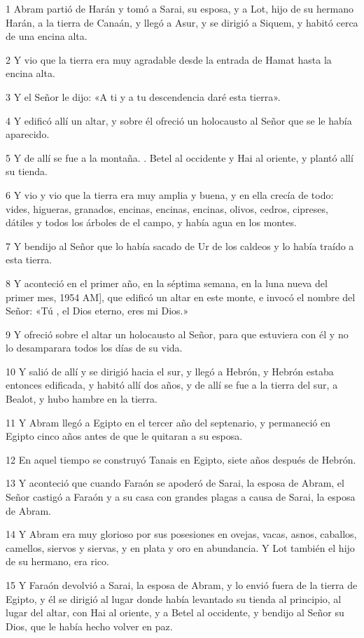 \par 1 Abram partió de Harán y tomó a Sarai, su esposa, y a Lot, hijo de su hermano Harán, a la tierra de Canaán, y llegó a Asur, y se dirigió a Siquem, y habitó cerca de una encina alta.
\par 2 Y vio que la tierra era muy agradable desde la entrada de Hamat hasta la encina alta.
\par 3 Y el Señor le dijo: «A ti y a tu descendencia daré esta tierra».
\par 4 Y edificó allí un altar, y sobre él ofreció un holocausto al Señor que se le había aparecido.
\par 5 Y de allí se fue a la montaña. . Betel al occidente y Hai al oriente, y plantó allí su tienda.
\par 6 Y vio y vio que la tierra era muy amplia y buena, y en ella crecía de todo: vides, higueras, granados, encinas, encinas, encinas, olivos, cedros, cipreses, dátiles y todos los árboles de el campo, y había agua en los montes.
\par 7 Y bendijo al Señor que lo había sacado de Ur de los caldeos y lo había traído a esta tierra.
\par 8 Y aconteció en el primer año, en la séptima semana, en la luna nueva del primer mes, 1954 AM], que edificó un altar en este monte, e invocó el nombre del Señor: «Tú , el Dios eterno, eres mi Dios.»
\par 9 Y ofreció sobre el altar un holocausto al Señor, para que estuviera con él y no lo desamparara todos los días de su vida.
\par 10 Y salió de allí y se dirigió hacia el sur, y llegó a Hebrón, y Hebrón estaba entonces edificada, y habitó allí dos años, y de allí se fue a la tierra del sur, a Bealot, y hubo hambre en la tierra.
\par 11 Y Abram llegó a Egipto en el tercer año del septenario, y permaneció en Egipto cinco años antes de que le quitaran a su esposa.
\par 12 En aquel tiempo se construyó Tanais en Egipto, siete años después de Hebrón.
\par 13 Y aconteció que cuando Faraón se apoderó de Sarai, la esposa de Abram, el Señor castigó a Faraón y a su casa con grandes plagas a causa de Sarai, la esposa de Abram.
\par 14 Y Abram era muy glorioso por sus posesiones en ovejas, vacas, asnos, caballos, camellos, siervos y siervas, y en plata y oro en abundancia. Y Lot también el hijo de su hermano, era rico.
\par 15 Y Faraón devolvió a Sarai, la esposa de Abram, y lo envió fuera de la tierra de Egipto, y él se dirigió al lugar donde había levantado su tienda al principio, al lugar del altar, con Hai al oriente, y a Betel al occidente, y bendijo al Señor su Dios, que le había hecho volver en paz.
